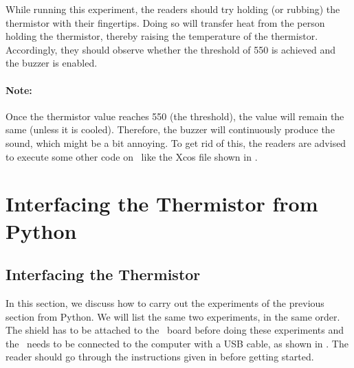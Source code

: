 \begin{enumerate}
        While running this experiment,
        the readers should try holding (or rubbing) the thermistor with their fingertips.
        Doing so will transfer heat from the person holding the
        thermistor, thereby raising the temperature of the thermistor.
        Accordingly, they should observe whether the threshold of 550 is achieved
        and the buzzer is enabled.

        \paragraph{Note:} Once the thermistor value reaches 550 (the threshold), the value will remain the same
        (unless it is cooled). Therefore, the buzzer will continuously produce the sound, which might be
        a bit annoying. To get rid of this, the readers are advised to
        execute some other code on \arduino\ like the Xcos file shown in
        .
\end{enumerate}


\section{Interfacing the Thermistor from Python}
\subsection{Interfacing the Thermistor}
In this section, we discuss how to carry out the experiments of the
previous section from Python.  We will list the same two experiments,
in the same order.  The shield has to be attached to the \arduino\ board
before doing these experiments and the \arduino\ needs to be connected to the computer
with a USB cable, as shown in .
The reader should go through the instructions given in
 before getting started.

